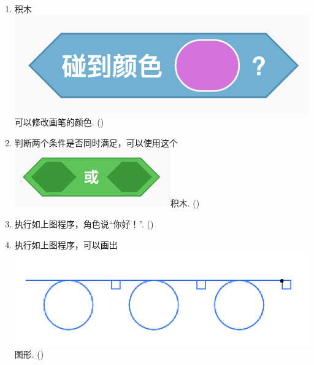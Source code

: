 \documentclass[10pt, a4paper]{article}
\begin{document}
\begin{enumerate}
        \item 积木\includegraphics[width=.15\textwidth]{32.png}可以修改画笔的颜色. (\qquad)

        \item 判断两个条件是否同时满足，可以使用这个\includegraphics[width=.15\textwidth]{33.png}积木. (\qquad)
        
        \item 执行如上图程序，角色说“你好！”. (\qquad)

        \item 执行如上图程序，可以画出\includegraphics[width=.2\textwidth]{35-1.png}图形. (\qquad)
    \end{enumerate}
\end{document}
